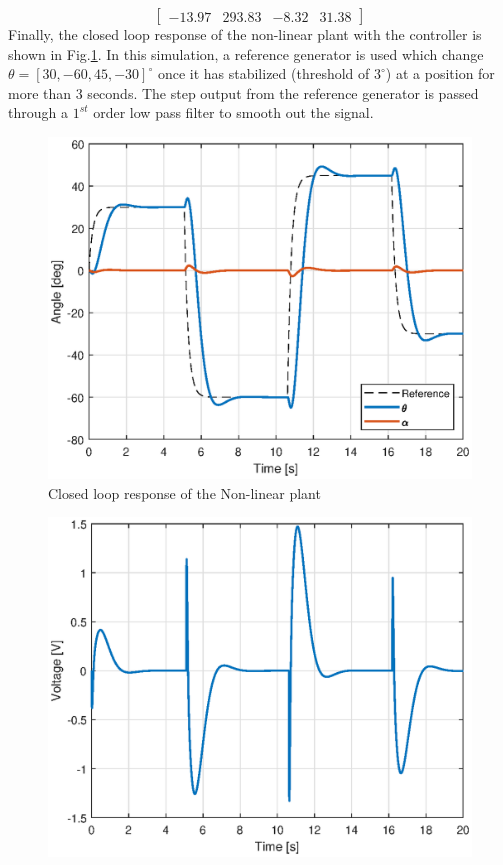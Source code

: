\documentclass[superscriptaddress,floatfix,reprint,amssymb, amsmath,aps, pre]{revtex4-1}
\begin{document}
{{\begin{equation}
\begin{bmatrix}
                -13.97 & 293.83 &  -8.32 &  31.38
            \end{bmatrix}
        \end{equation}
        Finally, the closed loop response of the non-linear plant with the controller is shown in Fig.\ref{fig:closedControl}. In this simulation, a reference generator is used which change \(\theta = [30,-60,45,-30]^\circ\) once it has stabilized (threshold of \(3^\circ\)) at a position for more than 3 seconds. The step output from the reference generator is passed through a \(1^{st}\) order low pass filter to smooth out the signal. 
        \begin{figure}[t!]
            \includegraphics[width = \linewidth]{closedControl.eps}
            \caption{Closed loop response of the Non-linear plant}
            \label{fig:closedControl}
        \end{figure}
        \begin{figure}[t!]
            \includegraphics[width = \linewidth]{controllerEffort.eps}

\end{figure}}}
\end{document}
